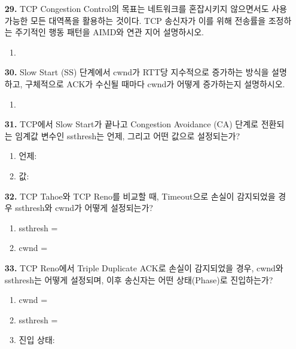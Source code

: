 \documentclass[a4paper, 10pt]{article}
\newcommand{\ansline}[1]{\underline{\hspace{#1}}}
\begin{document}
\begin{enumerate}[itemsep=2em, leftmargin=2em, label={}]
\item[\textbf{29.}] TCP Congestion Control의 목표는 네트워크를 혼잡시키지 않으면서도 사용 가능한 모든 대역폭을 활용하는 것이다. TCP 송신자가 이를 위해 전송률을 조정하는 주기적인 행동 패턴을 AIMD와 연관 지어 설명하시오.
\begin{enumerate}[label={}, itemsep=0.3em, leftmargin=1.5em]
    \item \ansline{12cm}
\end{enumerate}

\item[\textbf{30.}] Slow Start (SS) 단계에서 cwnd가 RTT당 지수적으로 증가하는 방식을 설명하고, 구체적으로 ACK가 수신될 때마다 cwnd가 어떻게 증가하는지 설명하시오.
\begin{enumerate}[label={}, itemsep=0.3em, leftmargin=1.5em]
    \item \ansline{12cm}
\end{enumerate}

\item[\textbf{31.}] TCP에서 Slow Start가 끝나고 Congestion Avoidance (CA) 단계로 전환되는 임계값 변수인 ssthresh는 언제, 그리고 어떤 값으로 설정되는가?
\begin{enumerate}[label=\alph*., itemsep=0.3em, leftmargin=1.5em]
    \item 언제: \ansline{6cm}
    \item 값: \ansline{6cm}
\end{enumerate}

\item[\textbf{32.}] TCP Tahoe와 TCP Reno를 비교할 때, Timeout으로 손실이 감지되었을 경우 ssthresh와 cwnd가 어떻게 설정되는가?
\begin{enumerate}[label=\alph*., itemsep=0.3em, leftmargin=1.5em]
    \item ssthresh = \ansline{6cm}
    \item cwnd = \ansline{6cm}
\end{enumerate}

\item[\textbf{33.}] TCP Reno에서 Triple Duplicate ACK로 손실이 감지되었을 경우, cwnd와 ssthresh는 어떻게 설정되며, 이후 송신자는 어떤 상태(Phase)로 진입하는가?
\begin{enumerate}[label=\alph*., itemsep=0.3em, leftmargin=1.5em]
    \item cwnd = \ansline{4cm}
    \item ssthresh = \ansline{4cm}
    \item 진입 상태: \ansline{4cm}
\end{enumerate}


\end{enumerate}
\end{document}
